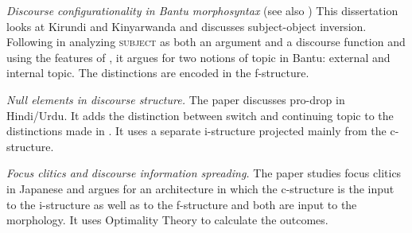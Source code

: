 \documentclass[output=paper,hidelinks]{langscibook}
\begin{document}
\vspace{+6pt} 
\citet{Morimoto2000} \textit{Discourse configurationality in Bantu morphosyntax} (see also \citealt{Morimoto09})  This dissertation looks at Kirundi and Kinyarwanda and discusses subject-object inversion. Following \citet{bresnan2001lexical} in analyzing \textsc{subject} as both an argument and a discourse function and using the features of \citet{Choi1996}, it argues for two notions of topic in Bantu: external and internal topic. The distinctions are encoded in the f-structure.


\vspace{+6pt}
\citet{BK00} \textit{Null elements in discourse structure.} The paper discusses pro-drop in Hindi/Urdu. It adds the distinction between switch and continuing topic to the distinctions made in \citet{BK96}. It uses a separate i-structure projected mainly from the c-structure.


\vspace{+6pt}
\citet{Otoguro03} \textit{Focus clitics and discourse information spreading.} The paper studies focus clitics in Japanese and argues for an architecture in which the c-structure is the input to the i-structure as well as to the f-structure and both are input to the morphology. It uses Optimality Theory to calculate the outcomes.
\end{document}
